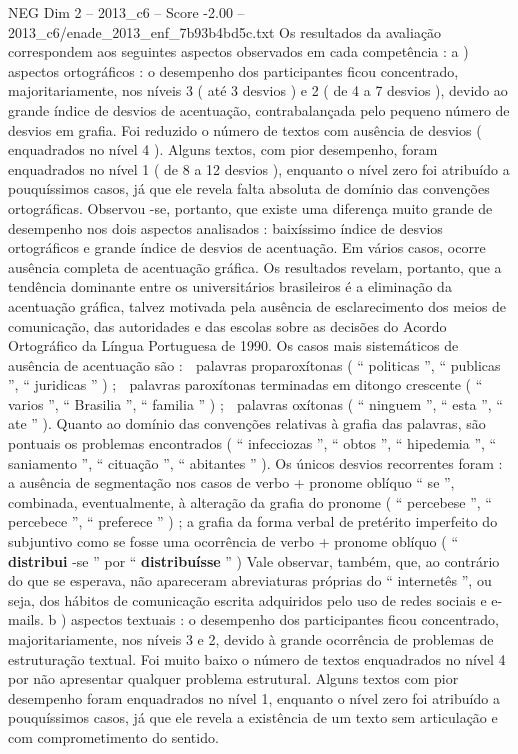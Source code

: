 \begin{textsample}{NEG Dim 2 – 2013\_c6 – Score -2.00 – 2013\_c6/enade\_2013\_enf\_7b93b4bd5c.txt}
Os resultados da avaliação correspondem aos seguintes aspectos observados em cada competência : a ) aspectos ortográficos : o desempenho dos participantes ficou concentrado, majoritariamente, nos níveis 3 ( até 3 desvios ) e 2 ( de 4 a 7 desvios ), devido ao grande índice de desvios de acentuação, contrabalançada pelo pequeno número de desvios em grafia.
Foi reduzido o número de textos com ausência de desvios ( enquadrados no nível 4 ).
Alguns textos, com pior desempenho, foram enquadrados no nível 1 ( de 8 a 12 desvios ), enquanto o nível zero foi atribuído a pouquíssimos casos, já que ele revela falta absoluta de domínio das convenções ortográficas.
Observou -se, portanto, que existe uma diferença muito grande de desempenho nos dois aspectos analisados : baixíssimo índice de desvios ortográficos e grande índice de desvios de acentuação.
Em vários casos, ocorre ausência completa de acentuação gráfica.
Os resultados revelam, portanto, que a tendência dominante entre os universitários brasileiros é a eliminação da acentuação gráfica, talvez motivada pela ausência de esclarecimento dos meios de comunicação, das autoridades e das escolas sobre as decisões do Acordo Ortográfico da Língua Portuguesa de 1990.
Os casos mais sistemáticos de ausência de acentuação são :  palavras proparoxítonas ( “ politicas ”, “ publicas ”, “ juridicas ” ) ;  palavras paroxítonas terminadas em ditongo crescente ( “ varios ”, “ Brasilia ”, “ familia ” ) ;  palavras oxítonas ( “ ninguem ”, “ esta ”, “ ate ” ).
Quanto ao domínio das convenções relativas à grafia das palavras, são pontuais os problemas encontrados ( “ infecciozas ”, “ obtos ”, “ hipedemia ”, “ saniamento ”, “ cituação ”, “ abitantes ” ).
Os únicos desvios recorrentes foram : a ausência de segmentação nos casos de verbo + pronome oblíquo “ se ”, combinada, eventualmente, à alteração da grafia do pronome ( “ percebese ”, “ percebece ”, “ preferece ” ) ; a grafia da forma verbal de pretérito imperfeito do subjuntivo como se fosse uma ocorrência de verbo + pronome oblíquo ( “ \textbf{distribui} -se ” por “ \textbf{distribuísse} ” ) Vale observar, também, que, ao contrário do que se esperava, não apareceram abreviaturas próprias do “ internetês ”, ou seja, dos hábitos de comunicação escrita adquiridos pelo uso de redes sociais e e-mails. b ) aspectos textuais : o desempenho dos participantes ficou concentrado, majoritariamente, nos níveis 3 e 2, devido à grande ocorrência de problemas de estruturação textual.
Foi muito baixo o número de textos enquadrados no nível 4 por não apresentar qualquer problema estrutural.
Alguns textos com pior desempenho foram enquadrados no nível 1, enquanto o nível zero foi atribuído a pouquíssimos casos, já que ele revela a existência de um texto sem articulação e com comprometimento do sentido.

\end{textsample}
